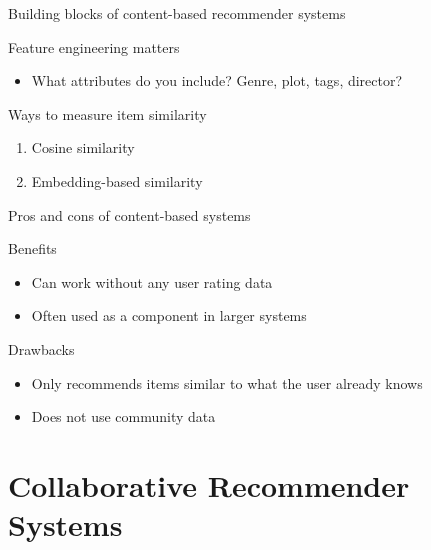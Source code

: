 \documentclass[compress]{beamer}
\begin{document}
\begin{frame}{Building blocks of content-based recommender systems}
  \begin{block}{Feature engineering matters}
    \begin{itemize}[<+>]
      \item What attributes do you include? Genre, plot, tags, director?
    \end{itemize}
  \end{block}
  \pause
  \begin{block}{Ways to measure item similarity}
    \begin{enumerate}[<+>]
      \item Cosine similarity
      \item Embedding-based similarity
    \end{enumerate}
  \end{block}
\end{frame}

\begin{frame}{Pros and cons of content-based systems}
  \begin{exampleblock}{Benefits}
    \begin{itemize}[<+>]
      \item Can work without any user rating data
      \item Often used as a component in larger systems
    \end{itemize}
  \end{exampleblock}
  \pause
  \begin{alertblock}{Drawbacks}
    \begin{itemize}[<+>]
      \item Only recommends items similar to what the user already knows
      \item Does not use community data
    \end{itemize}
  \end{alertblock}
\end{frame}

\section[Collaborative RS]{Collaborative Recommender Systems}
\end{document}
